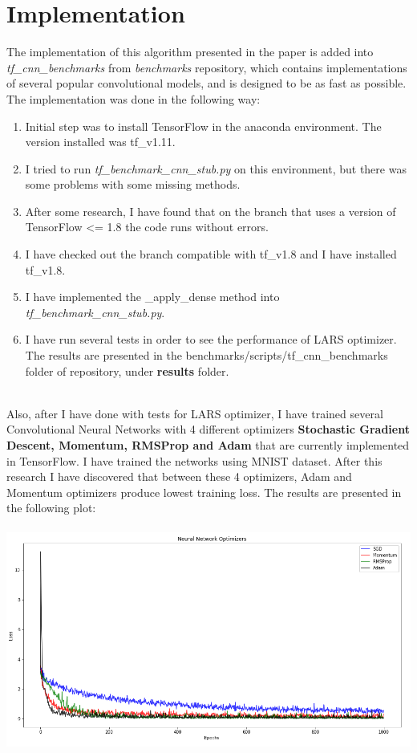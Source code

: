 \documentclass[12pt]{article}
\begin{document}
\section*{Implementation} 
\hspace*{10mm}The implementation of this algorithm presented in the paper is added into \textit{tf{\_}cnn{\_}benchmarks} from \textit{benchmarks} repository, which contains implementations of several popular convolutional models, and is designed to be as fast as possible. The implementation was done in the following way:
\begin{enumerate}[1.]
	\item Initial step was to install TensorFlow in the anaconda environment. The version installed was tf{\_}v1.11.
	\item I tried to run \textit{tf{\_}benchmark{\_}cnn{\_}stub.py} on this environment, but there was some problems with some missing methods.
	\item After some research, I have found that on the branch that uses a version of TensorFlow <= 1.8 the code runs without errors.
	\item I have checked out the branch compatible with tf{\_}v1.8 and I have installed tf{\_}v1.8.
	\item I have implemented the {\_}apply{\_}dense method into  \textit{tf{\_}benchmark{\_}cnn{\_}stub.py}. 
	\item I have run several tests in order to see the performance of LARS optimizer. The results are presented in the benchmarks/scripts/tf{\_}cnn{\_}benchmarks folder of repository, under \textbf{results} folder.
\end{enumerate} \hspace*{10mm} \\
\hspace*{10mm}Also, after I have done with tests for LARS optimizer, I have trained several Convolutional Neural Networks with 4 different optimizers \textbf{Stochastic Gradient Descent, Momentum, RMSProp and Adam} that are currently implemented in TensorFlow. I have trained the networks using MNIST dataset. After this research I have discovered that between these 4 optimizers, Adam and Momentum optimizers produce lowest training loss. The results are presented in the following plot:\\
\hspace*{10mm} \\
\includegraphics[scale=0.65]{nn_optimizers}
\end{document}
